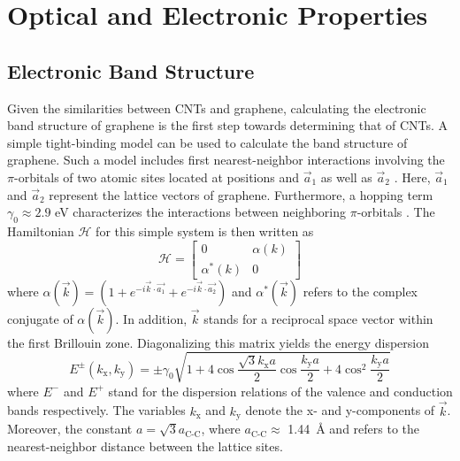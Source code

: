 \section{Optical and Electronic Properties}

\subsection{Electronic Band Structure}

Given the similarities between CNTs and graphene, calculating the electronic band structure of graphene is the first step towards determining that of CNTs. A simple tight-binding model can be used to calculate the band structure of graphene. Such a model includes first nearest-neighbor interactions involving the $\pi$-orbitals of two atomic sites located at positions and $\vec{a}_1$ as well as $\vec{a}_2$ \cite{charlier2007electronic}. Here, $\vec{a}_1$ and $\vec{a}_2$ represent the lattice vectors of graphene. Furthermore, a hopping term $\gamma_0 \approx 2.9$ eV  characterizes the interactions between neighboring $\pi$-orbitals \cite{charlier2007electronic}. The Hamiltonian $\mathcal{H}$ for this simple system is then written as
%
\begin{equation}
	\mathcal{H} = \begin{bmatrix}
	0 & \alpha(k) \\
	\alpha^*(k) & 0
	\end{bmatrix}
\end{equation}
%
where $\alpha(\vec{k}) = (1 + e^{-i \vec{k}\cdot \vec{a_1}} + e^{-i \vec{k}\cdot \vec{a_2}})$ and $\alpha^*(\vec{k})$ refers to the complex conjugate of $\alpha(\vec{k})$\cite{charlier2007electronic}. In addition, $\vec{k}$ stands for a reciprocal space vector within the first Brillouin zone. Diagonalizing this matrix yields the energy dispersion
%
\begin{equation}
	E^{\pm} (k_\text{x}, k_\text{y}) = \pm \gamma_0 \sqrt{1 + 4 \cos\dfrac{\sqrt{3}k_\text{x} a}{2}\cos\dfrac{k_\text{y} a}{2} + 4 \cos^2 \dfrac{k_\text{y} a}{2}}
	\label{eq:graphene_band}
\end{equation}
 where $E^-$ and $E^+$ stand for the dispersion relations of the valence and conduction bands respectively. The variables $k_\text{x}$ and $k_\text{y}$ denote the x- and y-components of $\vec{k}$. Moreover, the constant $a = \sqrt{3}a_\text{C-C}$, where $a_\text{C-C} \approx$ \SI{1.44}{\angstrom} and refers to the nearest-neighbor distance between the lattice sites.
%
